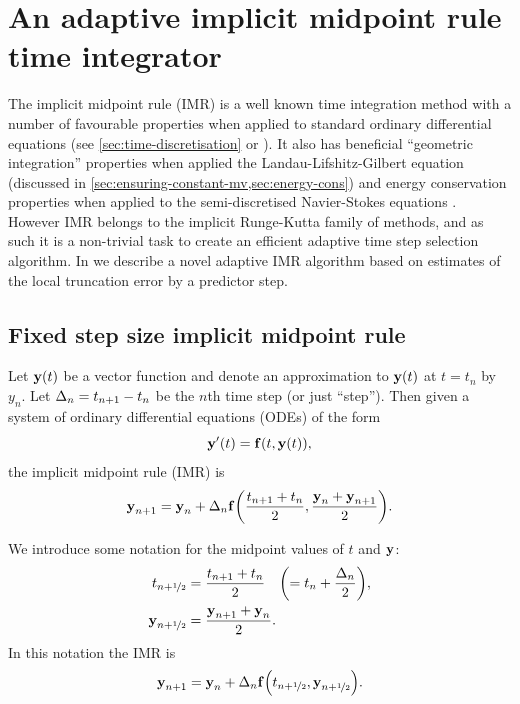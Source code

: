 

\chapter{An adaptive implicit midpoint rule time integrator}
\label{sec:adaptive-imr}


The implicit midpoint rule (IMR) is a well known time integration method with a number of favourable properties when applied to standard ordinary differential equations (see \cref{sec:time-discretisation} or \cite[204]{HairerNorsettWanner}).
It also has beneficial ``geometric integration'' properties when applied the Landau-Lifshitz-Gilbert equation (discussed in \cref{sec:ensuring-constant-mv,sec:energy-cons}) and energy conservation properties when applied to the semi-discretised Navier-Stokes equations \cite{Sanderse2013}.
However IMR belongs to the implicit Runge-Kutta family of methods, and as such it is a non-trivial task to create an efficient adaptive time step selection algorithm.
In  we describe a novel adaptive IMR algorithm based on estimates of the local truncation error by a predictor step.


\section{Fixed step size implicit midpoint rule}
\label{sec:fixed-step-implicit}

Let $\boldsymbol{\mathrm{y}}(t)$ be a vector function and denote an approximation to $\boldsymbol{\mathrm{y}}(t)$ at $t = t_n$ by $y_n$.
Let $\Delta_{n} = t_{n+1} - t_n$ be the $n$th time step (or just ``step'').
Then given a system of ordinary differential equations (ODEs) of the form
\begin{equation}
  \boldsymbol{\mathrm{y}}'(t) = {\boldsymbol{\mathrm{f}}{\left( t, \boldsymbol{\mathrm{y}}(t) \right)}},
  \label{eq:43}
\end{equation}
the implicit midpoint rule (IMR) is
\begin{equation}
    \boldsymbol{\mathrm{y}}_{n+1} = \boldsymbol{\mathrm{y}}_n + \Delta_{n} {\boldsymbol{\mathrm{f}}{\left( \frac{t_{n+1} + t_n}{2}, \frac{\boldsymbol{\mathrm{y}}_n + \boldsymbol{\mathrm{y}}_{n+1}}{2} \right)}}.
\end{equation}

We introduce some notation for the midpoint values of $t$ and $\boldsymbol{\mathrm{y}}$:
\begin{equation}
  \begin{aligned}
    t_{n+\nicefrac{1}{2}} & = \frac{t_{n+1} + t_n}{2} \quad {\left( = t_n + \frac{\Delta_{n}}{2} \right)}, \\
    \boldsymbol{\mathrm{y}}_{n+\nicefrac{1}{2}} &= \frac{\boldsymbol{\mathrm{y}}_{n+1} + \boldsymbol{\mathrm{y}}_n}{2}.
  \end{aligned}
\end{equation}
In this notation the IMR is
\begin{equation}
  \boldsymbol{\mathrm{y}}_{n+1} = \boldsymbol{\mathrm{y}}_n + \Delta_{n} {\boldsymbol{\mathrm{f}}{\left( t_{n+\nicefrac{1}{2}}, \boldsymbol{\mathrm{y}}_{n+\nicefrac{1}{2}} \right)}}.
  \label{eq:basic-midpoint}
\end{equation}

